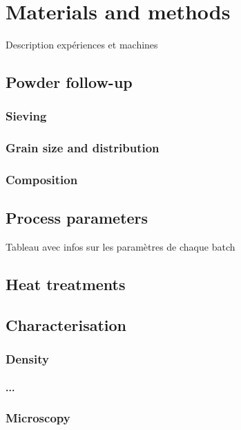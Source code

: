 \chapter{Materials and methods}
\label{Chap3}
Description expériences et machines
\section{Powder follow-up}

\subsection{Sieving}

\subsection{Grain size and distribution}

\subsection{Composition}


\section{Process parameters}
Tableau avec infos sur les paramètres de chaque batch

\section{Heat treatments}


\section{Characterisation}

\subsection{Density}

\subsubsection{...}

\subsection{Microscopy}

